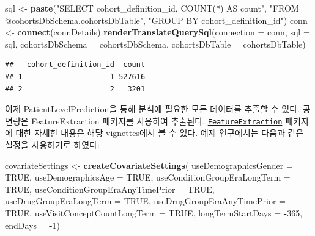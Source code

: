 \documentclass[10.5pt]{book}
\newenvironment{Shaded}{\begin{snugshade}}{\end{snugshade}}
\newcommand{\KeywordTok}[1]{\textcolor[rgb]{0.13,0.29,0.53}{\textbf{#1}}}
\newcommand{\DataTypeTok}[1]{\textcolor[rgb]{0.13,0.29,0.53}{#1}}
\newcommand{\DecValTok}[1]{\textcolor[rgb]{0.00,0.00,0.81}{#1}}
\newcommand{\StringTok}[1]{\textcolor[rgb]{0.31,0.60,0.02}{#1}}
\newcommand{\OtherTok}[1]{\textcolor[rgb]{0.56,0.35,0.01}{#1}}
\newcommand{\OperatorTok}[1]{\textcolor[rgb]{0.81,0.36,0.00}{\textbf{#1}}}
\newcommand{\NormalTok}[1]{#1}
\theoremstyle{definition}
\theoremstyle{definition}
\theoremstyle{definition}
\theoremstyle{remark}
\begin{document}
\begin{Shaded}
\begin{Highlighting}[]
\NormalTok{sql <-}\StringTok{ }\KeywordTok{paste}\NormalTok{(}\StringTok{"SELECT cohort_definition_id, COUNT(*) AS count"}\NormalTok{,}
\StringTok{"FROM @cohortsDbSchema.cohortsDbTable"}\NormalTok{,}
\StringTok{"GROUP BY cohort_definition_id"}\NormalTok{)}
\NormalTok{conn <-}\StringTok{ }\KeywordTok{connect}\NormalTok{(connDetails)}
\KeywordTok{renderTranslateQuerySql}\NormalTok{(}\DataTypeTok{connection =}\NormalTok{ conn, }
                        \DataTypeTok{sql =}\NormalTok{ sql,}
                        \DataTypeTok{cohortsDbSchema =}\NormalTok{ cohortsDbSchema,}
                        \DataTypeTok{cohortsDbTable =}\NormalTok{ cohortsDbTable)}
\end{Highlighting}
\end{Shaded}

\begin{verbatim}
##   cohort_definition_id  count
## 1                    1 527616
## 2                    2   3201
\end{verbatim}

이제
\href{https://ohdsi.github.io/PatientLevelPrediction/}{PatientLevelPrediction}을
통해 분석에 필요한 모든 데이터를 추출할 수 있다. 공변량은
FeatureExtraction 패키지를 사용하여 추출된다.
\href{https://ohdsi.github.io/FeatureExtraction/}{\texttt{FeatureExtraction}}
패키지에 대한 자세한 내용은 해당 vignettes에서 볼 수 있다. 예제
연구에서는 다음과 같은 설정을 사용하기로 하였다:

\begin{Shaded}
\begin{Highlighting}[]
\NormalTok{covariateSettings <-}\StringTok{ }\KeywordTok{createCovariateSettings}\NormalTok{(}
\DataTypeTok{useDemographicsGender =} \OtherTok{TRUE}\NormalTok{,}
                          \DataTypeTok{useDemographicsAge =} \OtherTok{TRUE}\NormalTok{,}
                          \DataTypeTok{useConditionGroupEraLongTerm =} \OtherTok{TRUE}\NormalTok{,}
                          \DataTypeTok{useConditionGroupEraAnyTimePrior =} \OtherTok{TRUE}\NormalTok{,}
                          \DataTypeTok{useDrugGroupEraLongTerm =} \OtherTok{TRUE}\NormalTok{,}
                          \DataTypeTok{useDrugGroupEraAnyTimePrior =} \OtherTok{TRUE}\NormalTok{,}
                          \DataTypeTok{useVisitConceptCountLongTerm =} \OtherTok{TRUE}\NormalTok{,}
                          \DataTypeTok{longTermStartDays =} \OperatorTok{-}\DecValTok{365}\NormalTok{,}
                          \DataTypeTok{endDays =} \OperatorTok{-}\DecValTok{1}\NormalTok{)}
\end{Highlighting}
\end{Shaded}
\end{document}

